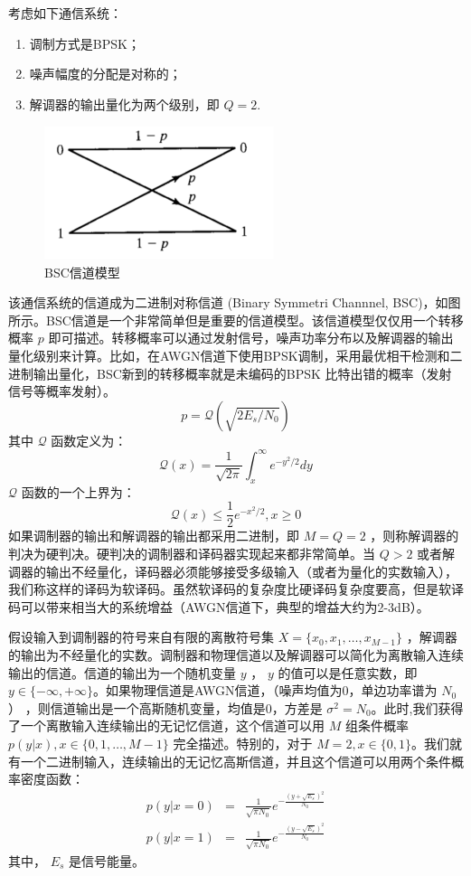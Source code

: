 \documentclass[10pt,a4paper,UTF8]{article}
\begin{document}
考虑如下通信系统：
\begin{enumerate}
\item 调制方式是BPSK；
\item 噪声幅度的分配是对称的；
\item 解调器的输出量化为两个级别，即 \(Q=2\).
\end{enumerate}

\begin{figure}[htb]
\centering
\includegraphics[width=0.6\textwidth]{../../img/20161113fig01_06a.png}
\caption{\label{fig:orgparagraph5}
BSC信道模型}
\end{figure}


该通信系统的信道成为二进制对称信道 (Binary Symmetri Channnel, BSC)，如图所示。BSC信道是一个非常简单但是重要的信道模型。该信道模型仅仅用一个转移概率 \(p\) 即可描述。转移概率可以通过发射信号，噪声功率分布以及解调器的输出量化级别来计算。比如，在AWGN信道下使用BPSK调制，采用最优相干检测和二进制输出量化，BSC新到的转移概率就是未编码的BPSK 比特出错的概率（发射信号等概率发射）。
\begin{equation}
\label{eq:20161113equ01_04}
p = \mathcal{Q} (\sqrt{2E_{s}/N_{0}})
\end{equation}
其中 \(\mathcal{Q}\) 函数定义为： \[\mathcal{Q}(x) = \frac{1}{\sqrt{2\pi}} \int_{x}^{\infty} e^{-y^{2}/2}dy\] 
\(\mathcal{Q}\) 函数的一个上界为： \[\mathcal{Q}(x) \leq \frac{1}{2} e^{-x^{2}/2}, x\geq 0\] 如果调制器的输出和解调器的输出都采用二进制，即 \(M=Q=2\) ，则称解调器的判决为硬判决。硬判决的调制器和译码器实现起来都非常简单。当 \(Q>2\) 或者解调器的输出不经量化，译码器必须能够接受多级输入（或者为量化的实数输入），我们称这样的译码为软译码。虽然软译码的复杂度比硬译码复杂度要高，但是软译码可以带来相当大的系统增益（AWGN信道下，典型的增益大约为2-3dB）。

假设输入到调制器的符号来自有限的离散符号集 \(X = \{ x_{0},x_{1},\ldots, x_{M-1}\}\) ，解调器的输出为不经量化的实数。调制器和物理信道以及解调器可以简化为离散输入连续输出的信道。信道的输出为一个随机变量 \(y\) ， \(y\) 的值可以是任意实数，即 \(y\in \{-\infty,+\infty\}\)。如果物理信道是AWGN信道，（噪声均值为0，单边功率谱为 \(N_{0}\) ） ，则信道输出是一个高斯随机变量，均值是0，方差是 \(\sigma^{2} = N_{0}\)。此时,我们获得了一个离散输入连续输出的无记忆信道，这个信道可以用 \(M\) 组条件概率 \(p(y|x),x\in \{0,1,\ldots,M-1\}\) 完全描述。特别的，对于 \(M=2,x\in \{0,1\}\)。我们就有一个二进制输入，连续输出的无记忆高斯信道，并且这个信道可以用两个条件概率密度函数：
\begin{eqnarray}
\label{eq:20161113equ01_06}
p(y|x=0)&=& \frac{1}{\sqrt{\pi N_{0}}} e^{-\frac{(y+\sqrt{E_{s}})^{2}}{N_{0}}} \\
p(y|x=1)&=& \frac{1}{\sqrt{\pi N_{0}}} e^{-\frac{(y-\sqrt{E_{s}})^{2}}{N_{0}}} 
\end{eqnarray}
其中， \(E_{s}\) 是信号能量。
\end{document}
